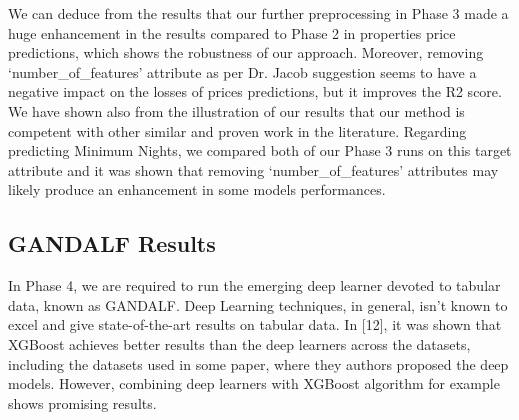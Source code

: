\documentclass[a4paper,12pt]{article}
\begin{document}
\begin{table}[h!]
    \centering
    \caption{df-Analyze Results of Predicting Minimum Nights}
    \label{tab:df_analyze_predicting_nights}
\end{table}

We can deduce from the results that our further preprocessing in Phase 3 made a huge enhancement in the results compared to Phase 2 in properties price predictions, which shows the robustness of our approach. Moreover, removing `number\_of\_features' attribute as per Dr. Jacob suggestion seems to have a negative impact on the losses of prices predictions, but it improves the R2 score. We have shown also from the illustration of our results that our method is competent with other similar and proven work in the literature. Regarding predicting Minimum Nights, we compared both of our Phase 3 runs on this target attribute and it was shown that removing `number\_of\_features' attributes may likely produce an enhancement in some models performances.

\subsection*{GANDALF Results}

In Phase 4, we are required to run the emerging deep learner devoted to tabular data, known as GANDALF. Deep Learning techniques, in general, isn't known to excel and give state-of-the-art results on tabular data. In [12], it was shown that XGBoost achieves better results than the deep learners across the datasets, including the datasets used in some paper, where they authors proposed the deep models. However, combining deep learners with XGBoost algorithm for example shows promising results. 
\end{document}

